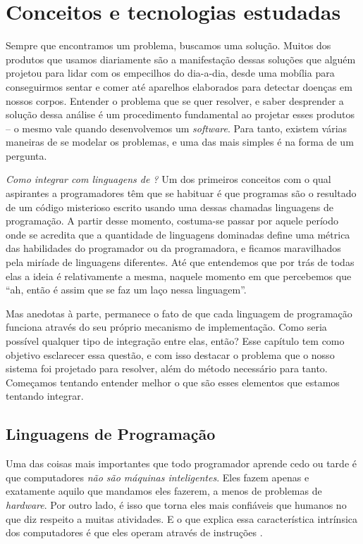 
\chapter{Conceitos e tecnologias estudadas}
\label{cap:conceitos}
  Sempre que encontramos um problema, buscamos uma solução. Muitos dos produtos
  que usamos diariamente são a manifestação dessas soluções que alguém projetou
  para lidar com os empecilhos do dia-a-dia, desde uma mobília para conseguirmos
  sentar e comer até aparelhos elaborados para detectar doenças em nossos
  corpos. Entender o problema que se quer resolver, e saber desprender a solução
  dessa análise é um procedimento fundamental ao projetar esses produtos -- o
  mesmo vale quando desenvolvemos um \textit{software}. Para tanto, existem
  várias maneiras de se modelar os problemas, e uma das mais simples é na forma
  de um pergunta.

  \emph{Como integrar \CXX{} com linguagens de \script{}?} Um dos primeiros
  conceitos com o qual aspirantes a programadores têm que se habituar é que
  programas são o resultado de um código misterioso escrito usando uma dessas
  chamadas linguagens de programação. A partir desse momento, costuma-se passar
  por aquele período onde se acredita que a quantidade de linguagens dominadas
  define uma métrica das habilidades do programador ou da programadora, e
  ficamos maravilhados pela miríade de linguagens diferentes. Até que entendemos
  que por trás de todas elas a ideia é relativamente a mesma, naquele momento em
  que percebemos que ``ah, então é assim que se faz um laço nessa linguagem''.
  
  Mas anedotas à parte, permanece o fato de que cada linguagem de programação
  funciona através do seu próprio mecanismo de implementação. Como seria
  possível qualquer tipo de integração entre elas, então? Esse capítulo tem
  como objetivo esclarecer essa questão, e com isso destacar o problema que
  o nosso sistema foi projetado para resolver, além do método necessário para
  tanto. Começamos tentando entender melhor o que são esses elementos que
  estamos tentando integrar.

  \section{Linguagens de Programação}
  \label{cap:conceitos:linguagens}
  Uma das coisas mais importantes que todo programador aprende cedo ou tarde é
  que computadores \emph{não são máquinas inteligentes}. Eles fazem apenas e
  exatamente aquilo que mandamos eles fazerem, a menos de problemas de
  \textit{hardware}. Por outro lado, é isso que torna eles mais confiáveis que
  humanos no que diz respeito a muitas atividades. E o que explica essa
  característica intrínsica dos computadores é que eles operam através de
  instruções \cite{cpp:00}.

